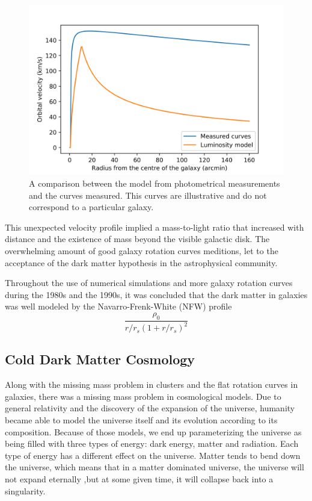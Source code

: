 \begin{figure}[H]
    \centering
    \includegraphics[scale=0.8]{imag/galaxyRotCurv.png}
    \caption{A comparison between the model from photometrical measurements and the curves measured. This curves are illustrative and do not correspond to a particular galaxy.}
    \label{galaxyCurve}
\end{figure}


This unexpected velocity profile implied a mass-to-light ratio that increased with distance and the existence of mass beyond the visible galactic disk\cite{theIsMassOutside}. The overwhelming amount of good galaxy rotation curves meditions, let to the acceptance of the dark matter hypothesis in the astrophysical community.

Throughout the use of numerical simulations and more galaxy rotation curves during the 1980s and the 1990s, it was concluded that the dark matter in galaxies was well modeled by the Navarro-Frenk-White (NFW) profile\cite{FWN}\cite{mariangela}\\
\begin{equation}
\frac{\rho_0}{r/r_s(1+r/r_s)^2}
\end{equation}

\subsection{Cold Dark Matter Cosmology}
Along with the missing mass problem in clusters and the flat rotation curves in galaxies, there was a missing mass problem in cosmological models. Due to general relativity and the discovery of the expansion of the universe, humanity became able to model the universe itself and its evolution according to its composition. Because of those models, we end up parameterizing the universe as being filled with three types of energy: dark energy, matter and radiation. Each type of energy has a different effect on the universe. Matter tends to bend down the universe, which means that in a matter dominated universe, the universe will not expand eternally ,but at some given time, it will collapse back into a singularity.

